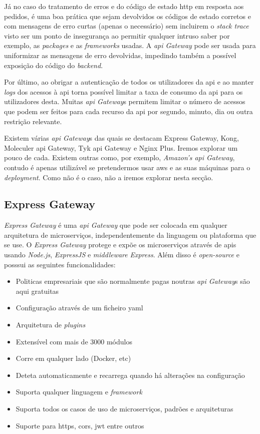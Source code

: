 Já no caso do tratamento de erros e do código de estado \acrshort{http} em resposta aos pedidos, é uma boa prática que sejam devolvidos os códigos de estado corretos e com mensagens de erro curtas (apenas o necessário) sem incluirem o \textit{stack trace} visto ser um ponto de insegurança ao permitir qualquer intruso saber por exemplo, as \textit{packages} e as \textit{frameworks} usadas. A \textit{\acrshort{api} Gateway} pode ser usada para uniformizar as mensagens de erro devolvidas, impedindo também a possível exposição do código do \textit{backend}.

Por último, ao obrigar a autenticação de todos os utilizadores da \acrshort{api} e ao manter \textit{logs} dos acessos à \acrshort{api} torna possível limitar a taxa de consumo da \acrshort{api} para os utilizadores desta. Muitas \textit{\acrshort{api} Gateway}s permitem limitar o número de acessos que podem ser feitos para cada recurso da \acrshort{api} por segundo, minuto, dia ou outra restrição relevante.

Existem várias \textit{\acrshort{api} Gateway}s das quais se destacam Express Gateway, Kong, Moleculer \acrshort{api} Gateway, Tyk \acrshort{api} Gateway e Nginx Plus. Iremos explorar um pouco de cada. Existem outras como, por exemplo, \textit{Amazon's \acrshort{api} Gateway}, contudo é apenas utilizável se pretendermos usar \acrshort{aws} e as suas máquinas para o \textit{deployment}. Como não é o caso, não a iremos explorar nesta secção.

\subsection{Express Gateway}

\textit{Express Gateway} é uma \textit{\acrshort{api} Gateway} que pode ser colocada em qualquer arquitetura de microserviços, independentemente da linguagem ou plataforma que se use. O \textit{Express Gateway} protege e expõe os microserviços através de \acrshort{api}s usando \textit{Node.js}, \textit{ExpressJS} e \textit{middleware} \textit{Express}. Além disso é \textit{open-source} e posssui as seguintes funcionalidades:~\cite{kong}
\begin{itemize}
    \item Politicas empresariais que são normalmente pagas noutras \textit{\acrshort{api} Gateway}s são aqui gratuitas
    \item Configuração através de um ficheiro \acrshort{yaml}
    \item Arquitetura de \textit{plugins}
    \item Extensível com mais de 3000 módulos
    \item Corre em qualquer lado (Docker, etc)
    \item Deteta automaticamente e recarrega quando há alterações na configuração
    \item Suporta qualquer linguagem e \textit{framework}
    \item Suporta todos os casos de uso de microserviços, padrões e arquiteturas
    \item Suporte para \acrshort{https}, \acrshort{cors}, \acrshort{jwt} entre outros
\end{itemize}

